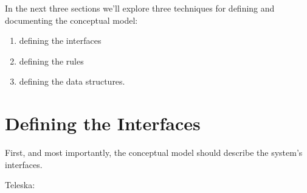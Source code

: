 
In the next three sections we'll explore three techniques for defining
and documenting the conceptual model:

\begin{enumerate} %
\item defining the interfaces
\item defining the rules
\item defining the data structures.
\end{enumerate}

\section{Defining the Interfaces}

\begin{tip}
First, and most importantly, the conceptual model should describe the
system's interfaces.
\end{tip}

\bigskip\blackline{2ex}
\noindent Teleska:

